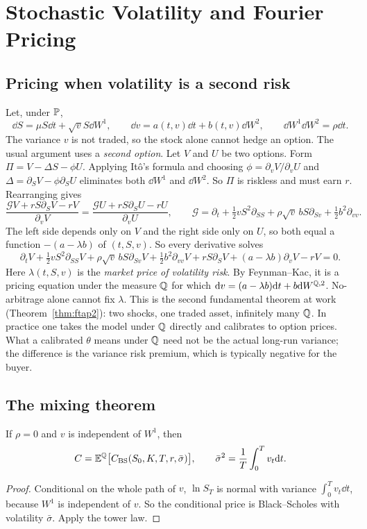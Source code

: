 \chapter{Stochastic Volatility and Fourier Pricing}\label{ch:sv}

\section{Pricing when volatility is a second risk}

Let, under $\mathbb{P}$,
\[
\dd S=\mu S\dd t+\sqrt{v}S\dd W^1,\qquad\dd v=a(t,v)\dd t+b(t,v)\dd W^2,\qquad\dd W^1\dd W^2=\rho\dd t.
\]
The variance $v$ is not traded, so the stock alone cannot hedge an option. The usual argument uses a \emph{second option}. Let $V$ and $U$ be two options. Form $\Pi=V-\Delta S-\phi U$. Applying It\^o's formula and choosing $\phi=\partial_vV/\partial_vU$ and $\Delta=\partial_SV-\phi\partial_SU$ eliminates both $\dd W^1$ and $\dd W^2$. So $\Pi$ is riskless and must earn $r$. Rearranging gives
\[
\frac{\mathcal{G}V+rS\partial_SV-rV}{\partial_vV}=\frac{\mathcal{G}U+rS\partial_SU-rU}{\partial_vU},
\qquad\mathcal{G}=\partial_t+\tfrac12vS^2\partial_{SS}+\rho\sqrt v\,bS\partial_{Sv}+\tfrac12b^2\partial_{vv}.
\]
The left side depends only on $V$ and the right side only on $U$, so both equal a function $-(a-\lambda b)$ of $(t,S,v)$. So every derivative solves
\begin{equation}\label{eq:svpde}
\partial_tV+\tfrac12vS^2\partial_{SS}V+\rho\sqrt v\,bS\partial_{Sv}V+\tfrac12b^2\partial_{vv}V+rS\partial_SV+(a-\lambda b)\partial_vV-rV=0.
\end{equation}
Here $\lambda(t,S,v)$ is the \emph{market price of volatility risk}. By Feynman--Kac, it is a pricing equation under the measure $\mathbb{Q}$ for which $\mathrm{d} v=(a-\lambda b)\mathrm{d} t+b\mathrm{d} W^{\mathbb{Q},2}$. No-arbitrage alone cannot fix $\lambda$. This is the second fundamental theorem at work (Theorem~\ref{thm:ftap2}): two shocks, one traded asset, infinitely many $\mathbb{Q}$. In practice one takes the model under $\mathbb{Q}$ directly and calibrates to option prices. What a calibrated $\theta$ means under $\mathbb{Q}$ need not be the actual long-run variance; the difference is the variance risk premium, which is typically negative for the buyer.

\section{The mixing theorem}

\begin{theorem}\label{thm:hw}
If $\rho=0$ and $v$ is independent of $W^1$, then
\[
C=\mathbb{E}^{\mathbb{Q}}\bigl[C_{\rm BS}(S_0,K,T,r,\bar\sigma)\bigr],\qquad\bar\sigma^2=\frac1T\int_0^Tv_t\mathrm{d} t.
\]
\end{theorem}
\begin{proof}
Conditional on the whole path of $v$, $\ln S_T$ is normal with variance $\int_0^Tv_t\dd t$, because $W^1$ is independent of $v$. So the conditional price is Black--Scholes with volatility $\bar\sigma$. Apply the tower law.
\end{proof}

